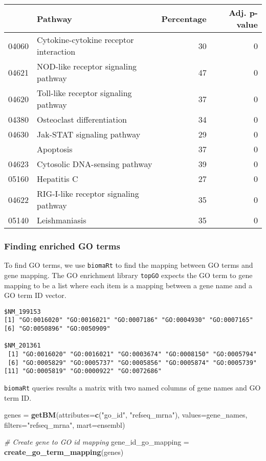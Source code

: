 \documentclass[9pt,a4paper,]{extarticle}
\newenvironment{Shaded}{\begin{snugshade}}{\end{snugshade}}
\newcommand{\CommentTok}[1]{\textcolor[rgb]{0.56,0.35,0.01}{\textit{#1}}}
\newcommand{\DataTypeTok}[1]{\textcolor[rgb]{0.13,0.29,0.53}{#1}}
\newcommand{\KeywordTok}[1]{\textcolor[rgb]{0.13,0.29,0.53}{\textbf{#1}}}
\newcommand{\NormalTok}[1]{#1}
\newcommand{\StringTok}[1]{\textcolor[rgb]{0.31,0.60,0.02}{#1}}
\begin{document}
\begin{tabular}{llrr}
\toprule
  & Pathway & Percentage & Adj. p-value\\
\midrule
04060 & Cytokine-cytokine receptor interaction & 30 & 0\\
04621 & NOD-like receptor signaling pathway & 47 & 0\\
04620 & Toll-like receptor signaling pathway & 37 & 0\\
04380 & Osteoclast differentiation & 34 & 0\\
04630 & Jak-STAT signaling pathway & 29 & 0\\
\addlinespace
04210 & Apoptosis & 37 & 0\\
04623 & Cytosolic DNA-sensing pathway & 39 & 0\\
05160 & Hepatitis C & 27 & 0\\
04622 & RIG-I-like receptor signaling pathway & 35 & 0\\
05140 & Leishmaniasis & 35 & 0\\
\bottomrule
\end{tabular}

\hypertarget{finding-enriched-go-terms}{%
\subsubsection{Finding enriched GO terms}\label{finding-enriched-go-terms}}

To find GO terms, we use \texttt{biomaRt} to find the mapping between GO terms and
gene mapping. The GO enrichment library \texttt{topGO} \citep{alexa:topgo} expects the GO term to gene
mapping to be a list where each item is a mapping between a gene name and a GO
term ID vector.

\begin{verbatim}
$NM_199153
[1] "GO:0016020" "GO:0016021" "GO:0007186" "GO:0004930" "GO:0007165"
[6] "GO:0050896" "GO:0050909"

$NM_201361
 [1] "GO:0016020" "GO:0016021" "GO:0003674" "GO:0008150" "GO:0005794"
 [6] "GO:0005829" "GO:0005737" "GO:0005856" "GO:0005874" "GO:0005739"
[11] "GO:0005819" "GO:0000922" "GO:0072686"
\end{verbatim}

\texttt{biomaRt} queries results a matrix with two named columns of gene names and GO
term ID.

\begin{Shaded}
\begin{Highlighting}[]
\NormalTok{genes =}\StringTok{ }\KeywordTok{getBM}\NormalTok{(}\DataTypeTok{attributes=}\KeywordTok{c}\NormalTok{(}\StringTok{"go_id"}\NormalTok{, }\StringTok{"refseq_mrna"}\NormalTok{),}
          \DataTypeTok{values=}\NormalTok{gene_names,}
          \DataTypeTok{filters=}\StringTok{"refseq_mrna"}\NormalTok{,}
          \DataTypeTok{mart=}\NormalTok{ensembl)}

\CommentTok{# Create gene to GO id mapping}
\NormalTok{gene_id_go_mapping =}\StringTok{ }\KeywordTok{create_go_term_mapping}\NormalTok{(genes)}
\end{Highlighting}
\end{Shaded}
\end{document}
